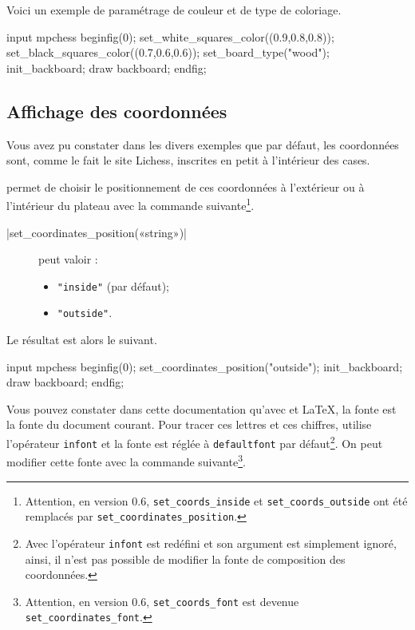 \documentclass[french]{ltxdoc}
\begin{document}
Voici un exemple de paramétrage de couleur et de type de coloriage. 

\begin{ExempleMP}
input mpchess
beginfig(0);
set_white_squares_color((0.9,0.8,0.8));
set_black_squares_color((0.7,0.6,0.6));
set_board_type("wood");
init_backboard;
draw backboard;
endfig;
\end{ExempleMP}

\subsection{Affichage des coordonnées}

Vous avez pu constater dans les divers exemples que par défaut, les coordonnées
sont, comme le fait le site Lichess, inscrites en petit à l’intérieur des
cases.

\mpchess permet de choisir le positionnement de ces coordonnées à l’extérieur ou
à l’intérieur du plateau avec la commande suivante\footnote{Attention,
en version 0.6, \lstinline+set_coords_inside+ et \lstinline+set_coords_outside+
ont été remplacés par 
\lstinline+set_coordinates_position+.}.

\commande|set_coordinates_position(«string»)|\smallskip

\begin{description}
  \item[] peut valoir :
\begin{itemize}
\item \lstinline+"inside"+ (par défaut);
\item \lstinline+"outside"+.
\end{itemize}
\end{description}


Le résultat est alors le suivant.

\begin{ExempleMP}
input mpchess
beginfig(0);
set_coordinates_position("outside");
init_backboard;
draw backboard;
endfig;
\end{ExempleMP}

Vous pouvez constater dans cette documentation qu’avec  et
\LaTeX, la fonte est la fonte du document courant. Pour tracer ces lettres et
ces chiffres, \mpchess utilise l’opérateur \MP{} \lstinline+infont+ et la fonte
est réglée à \lstinline+defaultfont+ par défaut\footnote{Avec 
l’opérateur \lstinline+infont+ est redéfini et son argument est simplement
ignoré, ainsi, il n’est pas possible de modifier la fonte de composition des
coordonnées.}. On peut modifier cette fonte avec la commande suivante\footnote{Attention,
en version 0.6, \lstinline+set_coords_font+ est devenue 
\lstinline+set_coordinates_font+.}.
\end{document}

